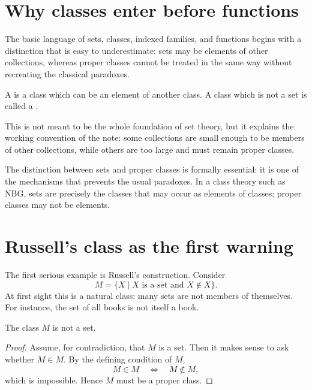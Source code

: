 
\section{Why classes enter before functions}

The basic language of sets, classes, indexed families, and functions begins with a distinction that is easy to underestimate: sets may be elements of other collections, whereas proper classes cannot be treated in the same way without recreating the classical paradoxes.

\begin{definition}
A  is a class which can be an element of another class.  A class which is not a set is called a .
\end{definition}

This is not meant to be the whole foundation of set theory, but it explains the working convention of the note: some collections are small enough to be members of other collections, while others are too large and must remain proper classes.

\begin{caution}
The distinction between sets and proper classes is formally essential: it is one of the mechanisms that prevents the usual paradoxes.  In a class theory such as NBG, sets are precisely the classes that may occur as elements of classes; proper classes may not be elements.
\end{caution}

\section{Russell's class as the first warning}

The first serious example is Russell's construction.  Consider
\[
  M = \{X \mid X \text{ is a set and } X \notin X\}.
\]
At first sight this is a natural class: many sets are not members of themselves.  For instance, the set of all books is not itself a book.

\begin{proposition}
The class \(M\) is not a set.
\end{proposition}

\begin{proof}
Assume, for contradiction, that \(M\) is a set.  Then it makes sense to ask whether \(M \in M\).  By the defining condition of \(M\),
\[
  M \in M \quad \Longleftrightarrow \quad M \notin M,
\]
which is impossible.  Hence \(M\) must be a proper class.
\end{proof}

